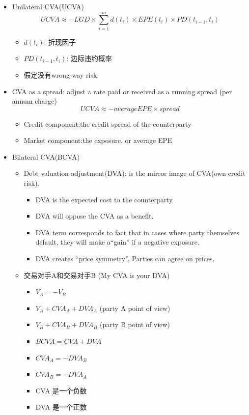 \begin{itemize}
    \item Unilateral CVA(UCVA)
\[
UCVA \approx -LGD \times \sum_{i=1}^{m} d(t_i) \times EPE(t_i) \times PD(t_{i-1}, t_i)
\]

\begin{itemize}
    \item \(d(t_i)\): 折现因子
    \item \(PD(t_{i-1}, t_i)\): 边际违约概率
    \item 假定没有wrong-way risk
\end{itemize}

\item CVA as a spread: adjust a rate paid or received as a running spread (per annum charge)
\[ UCVA \approx -average EPE \times spread \]
\begin{itemize}
    \item Credit component:the credit spread of the counterparty
    \item Market component:the exposure, or average EPE
\end{itemize}

\item Bilateral CVA(BCVA)
\begin{itemize}
    \item Debt valuation adjustment(DVA): is the mirror image of CVA(own credit risk).
    \begin{itemize}
        \item DVA is the expected cost to the counterparty
        \item DVA will oppose the CVA as a benefit.
       \item DVA term corresponds to fact that in cases where party themselves default, they will make a“gain” if a negative exposure.
       \item DVA creates “price symmetry”. Parties can agree on prices.
    \end{itemize}
    \item 交易对手A和交易对手B (My CVA is your DVA)

\begin{itemize}
    \item \( V_A = -V_B \)
    \item \( V_A + CVA_A + DVA_A \) (party A point of view)
    \item \( V_B + CVA_B + DVA_B \) (party B point of view)
    \item \( BCVA = CVA + DVA \)
    \item \( CVA_A = -DVA_B \)
    \item \( CVA_B = -DVA_A \)
    \item CVA 是一个负数
    \item DVA 是一个正数
\end{itemize}


\end{itemize}
\end{itemize}
